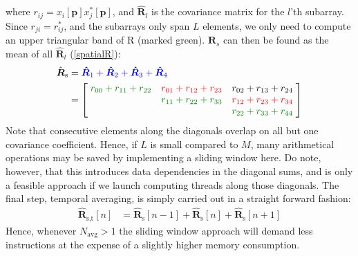 \documentclass[12pt,journal,captionsoff,onecolumn]{IEEEtran}
\newcommand\Green[1]{{\color{Green}#1}}
\renewcommand\vec[1]{\boldsymbol{#1}}
\newcommand\mat[1]{\boldsymbol{#1}}
\newcommand\1{\vec 1}
\newcommand*\p{\vec p}
\newcommand*\R{\mat R}
\newcommand*\eR{\mat{\hat R}}
\begin{document}
where $r_{ij} = x_i[\p]x_j^*[\p]$, and $\eR_{l}$ is the covariance matrix for the $l$'th subarray. Since $r_{ji} = r^*_{ij}$, and the subarrays only span $L$ elements, we only need to compute an upper triangular band of R (marked \Green{green}). $\R_s$ can then be found as the mean of all $\eR_l$ (\ref{spatialR}):
{\renewcommand*{\arraystretch}{1.8}
\begin{align*}
\hat{\mat R}_\text{s} &= \color{Blue}\eR_1 + \eR_2 + \eR_3 + \eR_4 \\
&= \left[\;
\begin{matrix}
\color{Green}r_{00}+r_{11}+r_{22} & \color{Red}r_{01}+r_{12}+r_{23} & r_{02}+r_{13}+r_{24} \\
                                       & \color{Green}r_{11}+r_{22}+r_{33} & \color{Red}r_{12}+r_{23}+r_{34} \\
                                       &                                        & \color{Green}r_{22}+r_{33}+r_{44}
\end{matrix}
\;\right]
\end{align*}}%
Note that consecutive elements along the diagonals overlap on all but one covariance coefficient. Hence, if $L$ is small compared to $M$, many arithmetical operations may be saved by implementing a sliding window here. Do note, however, that this introduces data dependencies in the diagonal sums, and is only a feasible approach if we launch computing threads along those diagonals. The final step, temporal averaging, is simply carried out in a straight forward fashion:
\begin{align*}
\eR_\text{s,t}[n] &= \eR_\text{s}[n-1] + \eR_\text{s}[n] + \eR_\text{s}[n+1]
\end{align*}%
Hence, whenever $N_\text{avg}>1$ the sliding window approach will demand less instructions at the expense of a slightly higher memory consumption.


\end{document}
